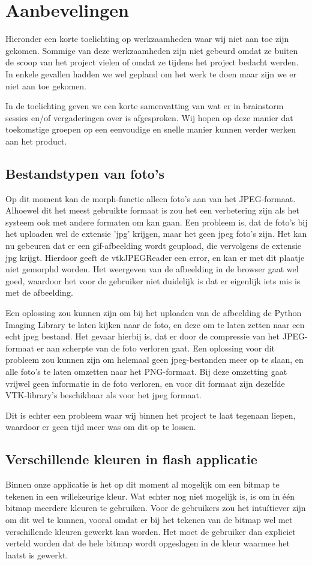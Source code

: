 \section{Aanbevelingen}
\label{Aanbevelingen}
Hieronder een korte toelichting op werkzaamheden waar wij niet aan toe zijn gekomen. 
Sommige van deze werkzaamheden zijn niet gebeurd omdat ze buiten de scoop van het project vielen of omdat ze tijdens het project bedacht werden. 
In enkele gevallen hadden we wel gepland om het werk te doen maar zijn we er niet aan toe gekomen.  

In de toelichting geven we een korte samenvatting van wat er in brainstorm sessies en/of vergaderingen over is afgesproken. 
Wij hopen op deze manier dat toekomstige groepen op een eenvoudige en snelle manier kunnen verder werken aan het product.

\subsection{Bestandstypen van foto's}
Op dit moment kan de morph-functie alleen foto's aan van het JPEG-formaat. 
Alhoewel dit het meest gebruikte formaat is zou het een verbetering zijn als het systeem ook met andere formaten om kan gaan. 
Een probleem is, dat de foto's bij het uploaden wel de extensie 'jpg' krijgen, maar het geen jpeg foto's zijn. 
Het kan nu gebeuren dat er een gif-afbeelding wordt geupload, die vervolgens de extensie jpg krijgt. 
Hierdoor geeft de vtkJPEGReader een error, en kan er met dit plaatje niet gemorphd worden. 
Het weergeven van de afbeelding in de browser gaat wel goed, waardoor het voor de gebruiker niet duidelijk is dat er eigenlijk iets mis is met de afbeelding.

Een oplossing zou kunnen zijn om bij het uploaden van de afbeelding de Python Imaging Library te laten kijken naar de foto, en deze om te laten zetten naar een echt jpeg bestand. 
Het gevaar hierbij is, dat er door de compressie van het JPEG-formaat er aan scherpte van de foto verloren gaat.
Een oplossing voor dit probleem zou kunnen zijn om helemaal geen jpeg-bestanden meer op te slaan, en alle foto's te laten omzetten naar het PNG-formaat. Bij deze omzetting gaat vrijwel geen informatie in de foto verloren, en voor dit formaat zijn dezelfde VTK-library's beschikbaar als voor het jpeg formaat.

Dit is echter een probleem waar wij binnen het project te laat tegenaan liepen, waardoor er geen tijd meer was om dit op te lossen.

\subsection{Verschillende kleuren in flash applicatie}
Binnen onze applicatie is het op dit moment al mogelijk om een bitmap te tekenen in een willekeurige kleur. 
Wat echter nog niet mogelijk is, is om in \'{e}\'{e}n bitmap meerdere kleuren te gebruiken.
Voor de gebruikers zou het intu\'{i}tiever zijn om dit wel te kunnen, vooral omdat er bij het tekenen van de bitmap wel met verschillende kleuren gewerkt kan worden.
Het moet de gebruiker dan expliciet verteld worden dat de hele bitmap wordt opgeslagen in de kleur waarmee het laatst is gewerkt.


